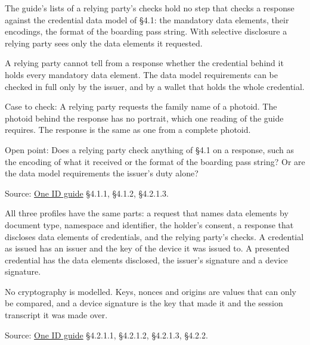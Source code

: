 \begin{definition}
  \label{def:c107}
  \notready
  The guide's lists of a relying party's checks hold no step that checks a
  response against the credential data model of §4.1: the mandatory data
  elements, their encodings, the format of the boarding pass string.  With
  selective disclosure a relying party sees only the data elements it
  requested.

  A relying party cannot tell from a response whether the credential behind
  it holds every mandatory data element.  The data model requirements can be
  checked in full only by the issuer, and by a wallet that holds the whole
  credential.

  Case to check: A relying party requests the family name of a photoid.  The
  photoid behind the response has no portrait, which one reading of the guide
  requires.  The response is the same as one from a complete photoid.

  Open point: Does a relying party check anything of §4.1 on a response, such
  as the encoding of what it received or the format of the boarding pass
  string?  Or are the data model requirements the issuer's duty alone?

  Source:
  \href{https://standards.atlassian.net/wiki/spaces/OneID/pages/2947416082/Technical+Implementation+Guide}{One ID guide} §4.1.1, §4.1.2, §4.2.1.3.
\end{definition}


\begin{definition}
  \label{def:exchange}
  All three profiles have the same parts: a request that names data elements by
  document type, namespace and identifier, the holder's consent, a response
  that discloses data elements of credentials, and the relying party's checks.
  A credential as issued has an issuer and the key of the device it was issued
  to.  A presented credential has the data elements disclosed, the issuer's
  signature and a device signature.

  No cryptography is modelled.  Keys, nonces and origins are values that can
  only be compared, and a device signature is the key that made it and the
  session transcript it was made over.

  Source: \href{https://standards.atlassian.net/wiki/spaces/OneID/pages/2947416082/Technical+Implementation+Guide}{One ID guide} §4.2.1.1, §4.2.1.2, §4.2.1.3, §4.2.2.
\end{definition}

